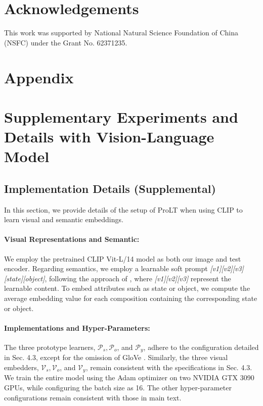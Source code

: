 \documentclass[letterpaper]{article} %
\theoremstyle{definition}
\begin{document}
\section*{Acknowledgements}
This work was supported by National Natural Science Foundation of
China (NSFC) under the Grant No. 62371235.



\clearpage
\noindent \section{Appendix}
\renewcommand\thefigure{A.\arabic{figure}} 
\renewcommand\theequation{A.\arabic{equation}} 
\renewcommand\thetable{A.\arabic{table}} 

\section{Supplementary Experiments and Details with Vision-Language Model}
\subsection{Implementation Details (Supplemental)}
In this section, we provide details of the setup of ProLT when using CLIP to learn visual and semantic embeddings.

\paragraph{Visual Representations and Semantic:} We employ the pretrained CLIP Vit-L/14 model as both our image and test encoder. Regarding semantics, we employ a learnable soft prompt \textit{[v1][v2][v3][state][object]}, following the approach of \citet{dfsp}, where \textit{[v1][v2][v3]} represent the learnable content. To embed attributes such as state or object, we compute the average embedding value for each composition containing the corresponding state or object.

\paragraph{Implementations and Hyper-Parameters: }The three prototype learners, $\mathcal{P}_{s},\mathcal{P}_{o}$, and $\mathcal{P}_{y}$, adhere to the configuration detailed in Sec. 4.3, except for the omission of GloVe \cite{glove}. Similarly, the three visual embedders, $\mathcal{V}_{s},\mathcal{V}_{o}$, and $\mathcal{V}_{y}$, remain consistent with the specifications in Sec. 4.3. We train the entire model using the Adam optimizer \cite{kingma2014adam} on two NVIDIA GTX 3090 GPUs, while configuring the batch size as 16. The other hyper-parameter configurations remain consistent with those in main text.
\end{document}
